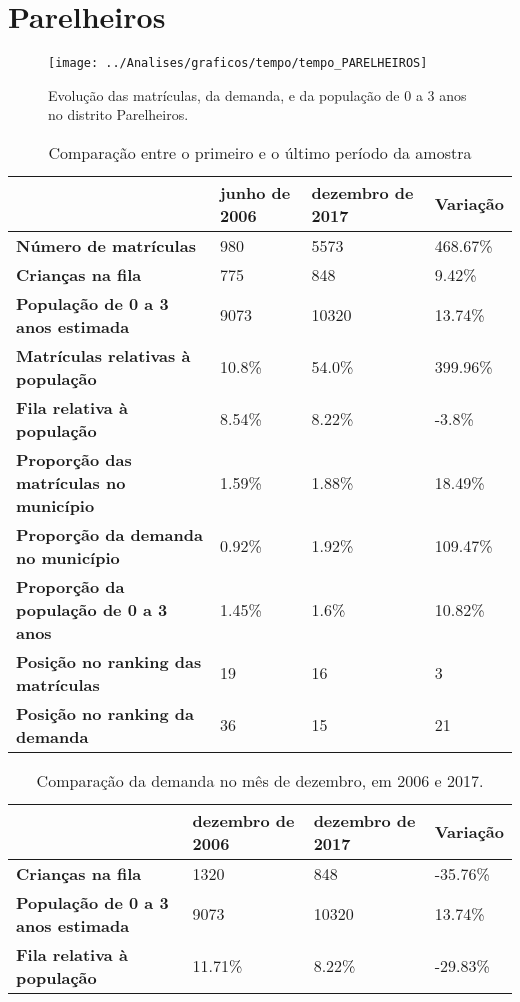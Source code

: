 \section{Parelheiros}
\begin{figure}[H]
\centering
\texttt{[image: ../Analises/graficos/tempo/tempo\_PARELHEIROS]}
\caption{Evolução das matrículas, da demanda, e da população de 0 a 3 anos no distrito Parelheiros.}
\end{figure}
\begin{table}[H]
\begin{tabular}{|l|l|l|l|}
\hline
\textbf{}                                      & \textbf{junho de 2006}       & \textbf{dezembro de 2017}    & \textbf{Variação} \\ \hline
\textbf{Número de matrículas}                  & 980 & 5573 & 468.67\% \\ \hline
\textbf{Crianças na fila}                      & 775 & 848 & 9.42\% \\ \hline
\textbf{População de 0 a 3 anos estimada}      & 9073 & 10320 & 13.74\% \\ \hline
\textbf{Matrículas relativas à população}      & 10.8\% & 54.0\% & 399.96\% \\ \hline
\textbf{Fila relativa à população}             & 8.54\% & 8.22\% & -3.8\% \\ \hline
\textbf{Proporção das matrículas no município} & 1.59\% & 1.88\% & 18.49\% \\ \hline
\textbf{Proporção da demanda no município}     & 0.92\% & 1.92\% & 109.47\% \\ \hline
\textbf{Proporção da população de 0 a 3 anos}  & 1.45\% & 1.6\% & 10.82\% \\ \hline
\textbf{Posição no ranking das matrículas}     & 19 & 16 & 3 \\ \hline
\textbf{Posição no ranking da demanda}         & 36 & 15 & 21 \\ \hline
\end{tabular}
\caption{Comparação entre o primeiro e o último período da amostra}
\end{table}
\begin{table}[H]
\begin{tabular}{|l|l|l|l|}
\hline
\textbf{}                                 & \textbf{dezembro de 2006} & \textbf{dezembro de 2017} & \textbf{Variação} \\ \hline
\textbf{Crianças na fila}                      & 1320 & 848 & -35.76\% \\ \hline
\textbf{População de 0 a 3 anos estimada}      & 9073 & 10320 & 13.74\% \\ \hline
\textbf{Fila relativa à população}             & 11.71\% & 8.22\% & -29.83\% \\ \hline
\end{tabular}
\caption{Comparação da demanda no mês de dezembro, em 2006 e 2017.}
\end{table}
